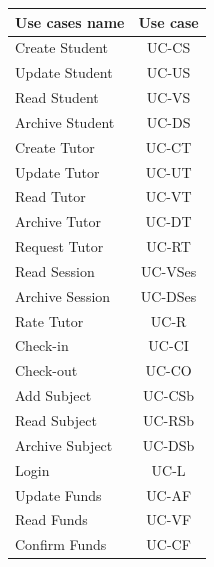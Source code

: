 \documentclass[12pt]{article}
\begin{document}
\begin{tabular}{| l | c |}

\hline

\textbf{Use cases name} & \textbf{Use case}	\\ \hline
			Create Student				&	UC-CS
			\\Update Student 			&	UC-US
			\\Read Student      		&	UC-VS
			\\Archive Student		&		UC-DS
			\\Create Tutor			&		UC-CT
			\\Update Tutor			&		UC-UT
			\\Read Tutor				&	UC-VT
			\\Archive Tutor			&		UC-DT
			\\Request Tutor			&		UC-RT
			\\Read Session				&	UC-VSes %
			\\Archive Session			&		UC-DSes %
			\\Rate Tutor				&	UC-R
			\\Check-in				&		UC-CI
			\\Check-out				&		UC-CO
			\\Add Subject			&		UC-CSb %
			\\Read Subject			&		UC-RSb
			\\Archive Subject		&		UC-DSb
			\\Login					&		UC-L
			\\Update Funds				&		UC-AF
			\\Read Funds				&		UC-VF
			\\Confirm Funds			&       UC-CF
			\\ \hline
\end{tabular}
\end{document}
